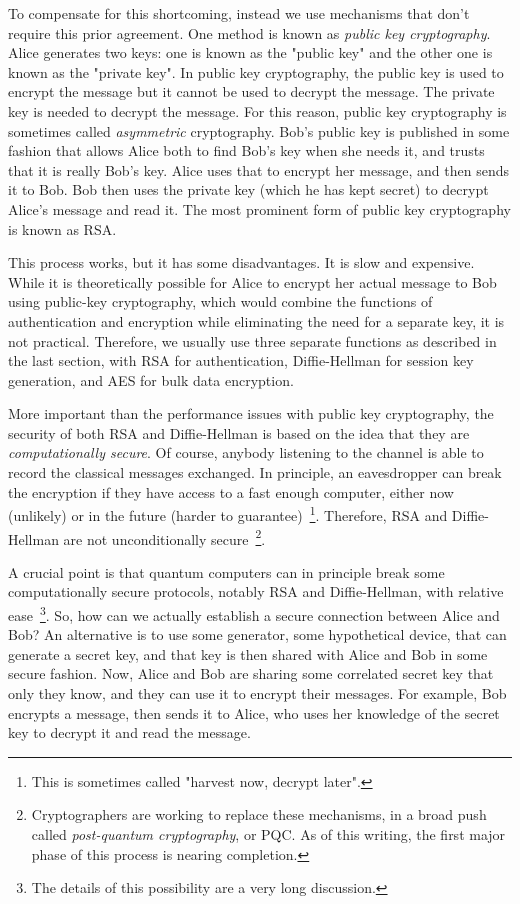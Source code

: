 To compensate for this shortcoming, instead we use mechanisms that don't require this prior agreement. One method is known as \emph{public key cryptography}. Alice generates two keys: one is known as the "public key" and the other one is known as the "private key".  In public key cryptography, the public key is used to encrypt the message but it cannot be used to decrypt the message. 
The private key is needed to decrypt the message.  For this reason, public key cryptography is sometimes called \emph{asymmetric} cryptography.  Bob's public key is published in some fashion that allows Alice both to find Bob's key when she needs it, and trusts that it is really Bob's key.  Alice uses that to encrypt her message, and then sends it to Bob. Bob then uses the private key (which he has kept secret) to decrypt Alice's message and read it.  The most prominent form of public key cryptography is known as RSA.

This process works, but it has some disadvantages. It is slow and expensive. While it is theoretically possible for Alice to encrypt her actual message to Bob using public-key cryptography, which would combine the functions of authentication and encryption while eliminating the need for a separate key, it is not practical.  Therefore, we usually use three separate functions as described in the last section, with RSA for authentication, Diffie-Hellman for session key generation, and AES for bulk data encryption.

More important than the performance issues with public key cryptography, the security of both RSA and Diffie-Hellman is based on the idea that they are \emph{computationally secure}.  Of course, anybody listening to the channel is able to record the classical messages exchanged. In principle, an eavesdropper can break the encryption if they have access to a fast enough computer, either now (unlikely) or in the future (harder to guarantee)~\footnote{This is sometimes called "harvest now, decrypt later".}.  Therefore, RSA and Diffie-Hellman are not unconditionally secure~\footnote{Cryptographers are working to replace these mechanisms, in a broad push called \emph{post-quantum cryptography}, or PQC.  As of this writing, the first major phase of this process is nearing completion.}.

A crucial point is that quantum computers can in principle break some computationally secure protocols, notably RSA and Diffie-Hellman, with relative ease~\footnote{The details of this possibility are a very long discussion.}. So, how can we actually establish a secure connection between Alice and Bob? An alternative is to use some generator, some hypothetical device, that can generate a secret key, and that key is then shared with Alice and Bob in some secure fashion. Now, Alice and Bob are sharing some correlated secret key that only they know, and they can use it to encrypt their messages. For example, Bob encrypts a message, then sends it to Alice, who uses her knowledge of the secret key to decrypt it and read the message.

